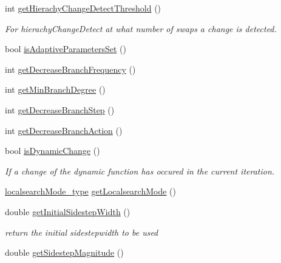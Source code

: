 \begin{CompactItemize}
int \hyperlink{classPSO_9f0b500a00467d6a2332f2094d585245}{getHierachyChangeDetectThreshold} ()
\begin{CompactList}\small\item\em For hierachyChangeDetect at what number of swaps a change is detected. \item\end{CompactList}\item 
bool \hyperlink{classPSO_91e7ffe95b7867a0bbff7a39cf859961}{isAdaptiveParametersSet} ()
\item 
int \hyperlink{classPSO_f6b5c807ceeeafc2110b7b4aa2f27242}{getDecreaseBranchFrequency} ()
\item 
int \hyperlink{classPSO_a1a30065babc73a1e54a426e5a0f6369}{getMinBranchDegree} ()
\item 
int \hyperlink{classPSO_2d101fa4fd266e53b9fd065c3b01e258}{getDecreaseBranchStep} ()
\item 
int \hyperlink{classPSO_68dd6992f7070c3e808f9331cb160521}{getDecreaseBranchAction} ()
\item 
bool \hyperlink{classPSO_7407b0e27405a6d49159ff8afb0d2e18}{isDynamicChange} ()
\begin{CompactList}\small\item\em If a change of the dynamic function has occured in the current iteration. \item\end{CompactList}\item 
\hyperlink{pso_8h_5e93114874fd3e3df67f0db1a4212e49}{localsearchMode\_\-type} \hyperlink{classPSO_393ccc4ad7ed55a99ca49cae4c295ccb}{getLocalsearchMode} ()
\item 
double \hyperlink{classPSO_eb56dd8010afe48a363ed5aa7b4cece5}{getInitialSidestepWidth} ()
\begin{CompactList}\small\item\em return the initial sidestepwidth to be used \item\end{CompactList}\item 
double \hyperlink{classPSO_e10c3d066b7d204d10698dc7c2e9305f}{getSidestepMagnitude} ()
\end{CompactItemize}
